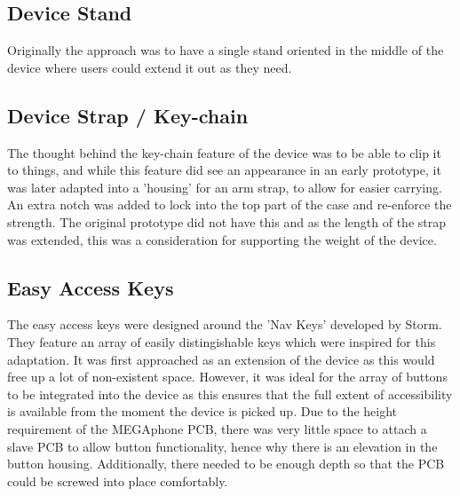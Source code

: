 
\subsection{Device Stand}

Originally the approach was to have a single stand oriented in the middle of the device where users could extend it out as they need.

\subsection{Device Strap / Key-chain}

The thought behind the key-chain feature of the device was to be able to clip it to things, and while this feature did see an appearance in an early prototype, it was later adapted into a 'housing' for an arm strap, to allow for easier carrying.
An extra notch was added to lock into the top part of the case and re-enforce the strength. The original prototype did not have this and as the length of the strap was extended, this was a consideration for supporting the weight of the device.

\subsection{Easy Access Keys}

The easy access keys were designed around the 'Nav Keys' developed by Storm. 
They feature an array of easily distingishable keys which were inspired for this adaptation. 
It was first approached as an extension of the device as this would free up a lot of non-existent space.
However, it was ideal for the array of buttons to be integrated into the device as this ensures that the full extent of accessibility is available from the moment the device is picked up.
Due to the height requirement of the MEGAphone PCB, there was very little space to attach a slave PCB to allow button functionality, hence why there is an elevation in the button housing.
Additionally, there needed to be enough depth so that the PCB could be screwed into place comfortably.


